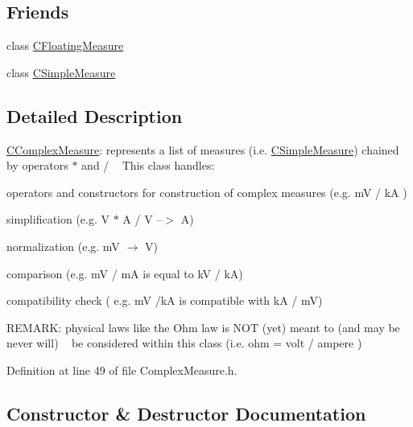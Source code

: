 \subsection*{Friends}
\begin{DoxyCompactItemize}
\item 
class \hyperlink{classCComplexMeasure_a7e23751869edf87edc0feeb80eda78d9}{C\+Floating\+Measure}
\item 
class \hyperlink{classCComplexMeasure_ac06bbec937fbb103ef6191c80bfa5880}{C\+Simple\+Measure}
\end{DoxyCompactItemize}


\subsection{Detailed Description}
\hyperlink{classCComplexMeasure}{C\+Complex\+Measure}\+: represents a list of measures (i.\+e. \hyperlink{classCSimpleMeasure}{C\+Simple\+Measure}) chained by operators $\ast$ and / ~\newline
 This class handles\+: 


\begin{DoxyItemize}
\item operators and constructors for construction of complex measures (e.\+g. mV / kA )
\item simplification (e.\+g. V $\ast$ A / V --$>$ A)
\item normalization (e.\+g. mV $\rightarrow$ V)
\item comparison (e.\+g. mV / mA is equal to kV / kA)
\item compatibility check ( e.\+g. mV /kA is compatible with kA / mV)~\newline

\end{DoxyItemize}

R\+E\+M\+A\+RK\+: physical laws like the Ohm law is N\+OT (yet) meant to (and may be never will) ~\newline
 be considered within this class (i.\+e. ohm = volt / ampere ) 

Definition at line 49 of file Complex\+Measure.\+h.



\subsection{Constructor \& Destructor Documentation}
\mbox{\label{classCComplexMeasure_a5501594d4a8efdf565aa4c6bc6ce0379}} 
